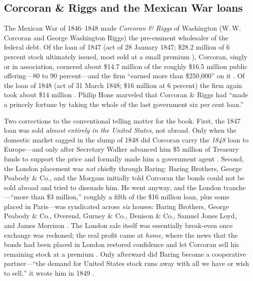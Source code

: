 \documentclass[12pt]{article}
\begin{document}
\subsection{Corcoran \& Riggs and the Mexican War loans}

The Mexican War of 1846--1848 made \emph{Corcoran \& Riggs} of Washington
(W.\,W. Corcoran and George Washington Riggs) the pre-eminent wholesaler of the
federal debt. Of the loan of 1847 (act of 28 January 1847; \$28.2 million of $6$
percent stock ultimately issued, most sold at a small premium
\citep{bayley1881national}), Corcoran, singly or in association, cornered about
\$14.7 million of the roughly \$16.5 million public offering---$80$ to $90$
percent---and the firm ``earned more than \$250{,}000'' on it
\citep[45--49]{cohen1971business}. Of the loan of 1848 (act of 31 March 1848;
\$16 million at $6$ percent) the firm again took about \$14 million
\citep[49--51]{cohen1971business}. Philip Hone marveled
that Corcoran \& Riggs had ``made a princely fortune by taking the whole of the
last government six per cent loan.''

Two corrections to the conventional telling matter for the book. First, the 1847
loan was sold \emph{almost entirely in the United States}, not abroad. Only when
the domestic market sagged in the slump of 1848 did Corcoran carry the
\emph{1848} loan to Europe---and only after Secretary Walker advanced him \$5
million of Treasury funds to support the price and formally made him a government
agent \citep[54--55]{cohen1971business}. Second, the London placement was
\emph{not} chiefly through Baring: Baring Brothers, George Peabody \& Co., and
the Morgans initially told Corcoran the bonds could not be sold abroad and tried
to dissuade him. He went anyway, and the London tranche---``more than \$3
million,'' roughly a fifth of the \$16 million loan, plus some placed in
Paris---was syndicated across \emph{six} houses: Baring Brothers, George Peabody
\& Co., Overend, Gurney \& Co., Denison \& Co., Samuel Jones Loyd, and James
Morrison \citep[54--58]{cohen1971business}. The London sale itself was essentially
break-even once exchange was reckoned; the real profit came at \emph{home}, where
the news that the bonds had been placed in London restored confidence and let
Corcoran sell his remaining stock at a premium \citep{goldstein1998capital}. Only
afterward did Baring become a cooperative partner---``the demand for United
States stock runs away with all we have or wish to sell,'' it wrote him in 1849
\citep[57]{cohen1971business}.
\end{document}
